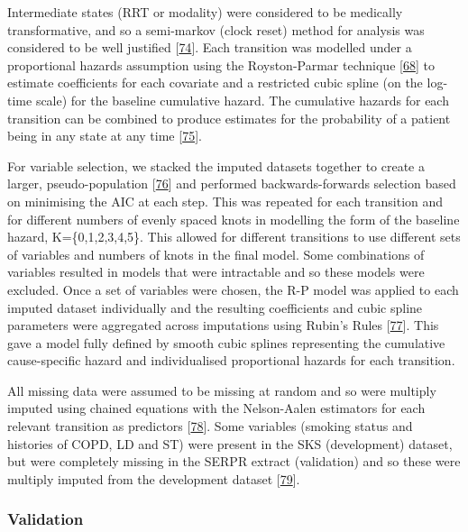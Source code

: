 \documentclass[
]{article}
\begin{document}
Intermediate states (RRT or modality) were considered to be medically transformative, and so a semi-markov (clock reset) method for analysis was considered to be well justified {[}\protect\hyperlink{ref-meira-machado_multi-state_2009}{74}{]}. Each transition was modelled under a proportional hazards assumption using the Royston-Parmar technique {[}\protect\hyperlink{ref-royston_flexible_2002}{68}{]} to estimate coefficients for each covariate and a restricted cubic spline (on the log-time scale) for the baseline cumulative hazard. The cumulative hazards for each transition can be combined to produce estimates for the probability of a patient being in any state at any time {[}\protect\hyperlink{ref-putter_tutorial_2007}{75}{]}.

For variable selection, we stacked the imputed datasets together to create a larger, pseudo-population {[}\protect\hyperlink{ref-wood_how_2008}{76}{]} and performed backwards-forwards selection based on minimising the AIC at each step. This was repeated for each transition and for different numbers of evenly spaced knots in modelling the form of the baseline hazard, K=\{0,1,2,3,4,5\}. This allowed for different transitions to use different sets of variables and numbers of knots in the final model. Some combinations of variables resulted in models that were intractable and so these models were excluded. Once a set of variables were chosen, the R-P model was applied to each imputed dataset individually and the resulting coefficients and cubic spline parameters were aggregated across imputations using Rubin's Rules {[}\protect\hyperlink{ref-rubin_multiple_1984}{77}{]}. This gave a model fully defined by smooth cubic splines representing the cumulative cause-specific hazard and individualised proportional hazards for each transition.

All missing data were assumed to be missing at random and so were multiply imputed using chained equations with the Nelson-Aalen estimators for each relevant transition as predictors {[}\protect\hyperlink{ref-white_imputing_2009}{78}{]}. Some variables (smoking status and histories of COPD, LD and ST) were present in the SKS (development) dataset, but were completely missing in the SERPR extract (validation) and so these were multiply imputed from the development dataset {[}\protect\hyperlink{ref-janssen_dealing_2009}{79}{]}.

\hypertarget{validation}{%
\subsubsection{Validation}\label{validation}}
\end{document}
